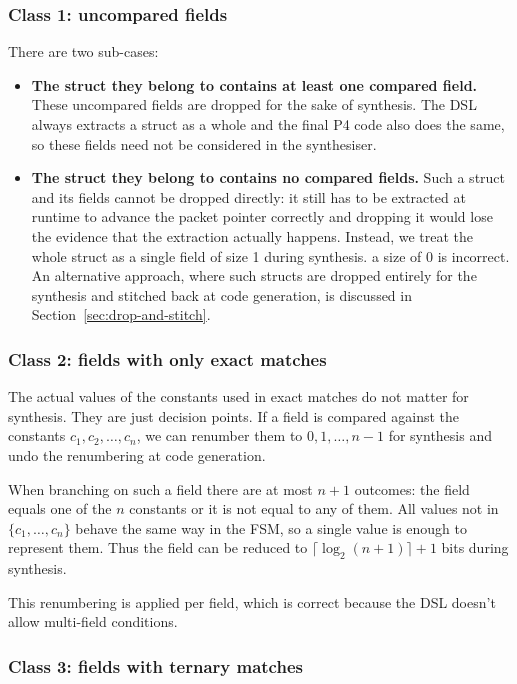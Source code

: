 \subsubsection*{Class 1: uncompared fields}

There are two sub-cases:
\begin{itemize}
    \item \textbf{The struct they belong to contains at least one compared field.} These
    uncompared fields are dropped for the sake of synthesis. The DSL
    always extracts a struct as a whole and the final P4 code also does the
    same, so these fields need not be considered in the synthesiser.

    \item \textbf{The struct they belong to contains no compared fields.} Such a struct and its fields
    cannot be dropped directly: it still has to be extracted at runtime to
    advance the packet pointer correctly and dropping it would lose the
    evidence that the extraction actually happens. Instead, we treat the whole
    struct as a single field of size 1 during synthesis. 
    a size of 0 is incorrect. An alternative approach, where such
    structs are dropped entirely for the synthesis and stitched back at
    code generation, is discussed in
    Section~\ref{sec:drop-and-stitch}.
\end{itemize}

\subsubsection*{Class 2: fields with only exact matches}

The actual values of the constants used in exact matches do not matter
for synthesis. They are just decision points. If a field is compared
against the constants $c_1, c_2, \ldots, c_n$, we can renumber them to
$0, 1, \ldots, n-1$ for synthesis and undo the renumbering at code
generation.

When branching on such a field there are at most $n+1$ outcomes:
the field equals one of the $n$ constants or it is not equal to any of them. All
values not in $\{c_1, \ldots, c_n\}$ behave the same way in the
FSM, so a single value is enough to represent them. Thus the field can be reduced to
$\lceil \log_2(n+1) \rceil+1$ bits during synthesis.

This renumbering is applied per field, which is correct because the DSL doesn't allow
multi-field conditions.

\subsubsection*{Class 3: fields with ternary matches}


